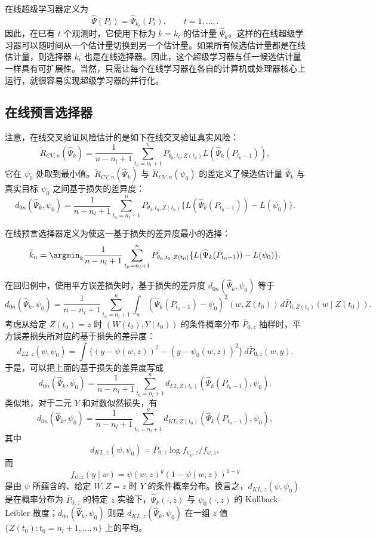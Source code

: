 在线超级学习器定义为
\[
 \widehat\Psi(P_t)=\widehat\Psi_{k_t}(P_t),\qquad t=1,\ldots,.
\]
因此，在已有 $t$ 个观测时，它使用下标为 $k=k_t$ 的估计量 $\widehat\Psi_k$。这样的在线超级学习器可以随时间从一个估计量切换到另一个估计量。如果所有候选估计量都是在线估计量，则选择器 $k_t$ 也是在线选择器。因此，这个超级学习器与任一候选估计量一样具有可扩展性。当然，只需让每个在线学习器在各自的计算机或处理器核心上运行，就很容易实现超级学习器的并行化。

\subsection{在线预言选择器}

注意，在线交叉验证风险估计的是如下在线交叉验证真实风险：
\[
 \widetilde R_{CV,n}(\widehat\Psi_k)
 =\frac{1}{n-n_l+1}\sum_{t_0=n_l+1}^{n}
 P_{\theta_0,t_0,Z(t_0)}L(\widehat\Psi_k(P_{t_0-1})),
\]
它在 $\psi_0$ 处取到最小值。$\widetilde R_{CV,n}(\widehat\Psi_k)$ 与 $\widetilde R_{CV,n}(\psi_0)$ 的差定义了候选估计量 $\widehat\Psi_k$ 与真实目标 $\psi_0$ 之间基于损失的差异度：
\[
 d_{0n}(\widehat\Psi_k,\psi_0)
 =\frac{1}{n-n_l+1}\sum_{t_0=n_l+1}^{n}
 P_{\theta_0,t_0,Z(t_0)}\{L(\widehat\Psi_k(P_{t_0-1}))-L(\psi_0)\}.
\]

在线预言选择器定义为使这一基于损失的差异度最小的选择：
\[
 \widetilde k_n=\argmin_k\frac{1}{n-n_l+1}\sum_{t_0=n_l+1}^{n}
 P_{\theta_0,t_0,Z(t_0)}\{L(\widehat\Psi_k(P_{t_0-1}))-L(\psi_0)\}.
\]

在回归例中，使用平方误差损失时，基于损失的差异度 $d_{0n}(\widehat\Psi_k,\psi_0)$ 等于
\[
 d_{0n}(\widehat\Psi_k,\psi_0)
 =\frac{1}{n-n_l+1}\sum_{t_0=n_l+1}^{n}
 \int_w(\widehat\Psi_k(P_{t_0-1})-\psi_0)^2(w,Z(t_0))
 \,d\bar P_{0,Z(t_0)}(w\mid Z(t_0)).
\]
考虑从给定 $Z(t_0)=z$ 时 $(W(t_0),Y(t_0))$ 的条件概率分布 $\bar P_{0,z}$ 抽样时，平方误差损失所对应的基于损失的差异度：
\[
 d_{L2,z}(\psi,\psi_0)
 =\int\{(y-\psi(w,z))^2-(y-\psi_0(w,z))^2\}
 \,d\bar P_{0,z}(w,y).
\]
于是，可以把上面的基于损失的差异度写成
\[
 d_{0n}(\widehat\Psi_k,\psi_0)
 =\frac{1}{n-n_l+1}\sum_{t_0=n_l+1}^{n}
 d_{L2,Z(t_0)}(\widehat\Psi_k(P_{t_0-1}),\psi_0).
\]
类似地，对于二元 $Y$ 和对数似然损失，有
\[
 d_{0n}(\widehat\Psi_k,\psi_0)
 =\frac{1}{n-n_l+1}\sum_{t_0=n_l+1}^{n}
 d_{KL,Z(t_0)}(\widehat\Psi_k(P_{t_0-1}),\psi_0),
\]
其中
\[
 d_{KL,z}(\psi,\psi_0)=\bar P_{0,z}\log f_{\psi_0,z}/f_{\psi,z},
\]
而
\[
 f_{\psi,z}(y\mid w)=\psi(w,z)^y(1-\psi(w,z))^{1-y}
\]
是由 $\psi$ 所蕴含的、给定 $W,Z=z$ 时 $Y$ 的条件概率分布。换言之，$d_{KL,z}(\psi,\psi_0)$ 是在概率分布为 $\bar P_{0,z}$ 的特定 $z$ 实验下，$\widehat\Psi_k(\cdot,z)$ 与 $\psi_0(\cdot,z)$ 的 Kullback–Leibler 散度；$d_{0n}(\widehat\Psi_k,\psi_0)$ 则是 $d_{KL,z}(\widehat\Psi_k,\psi_0)$ 在一组 $z$ 值 $\{Z(t_0):t_0=n_l+1,\ldots,n\}$ 上的平均。

